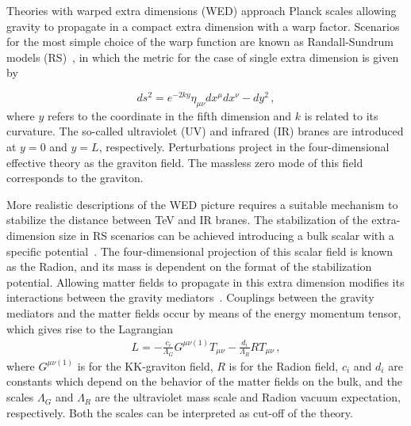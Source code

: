 Theories with warped extra dimensions (WED) approach Planck scales allowing gravity 
to propagate in a compact extra dimension with a warp factor.
Scenarios for the most simple choice of the warp function are known as Randall-Sundrum models
(RS)~\cite{Randall:1999ee}, in which the metric for the case of single extra dimension is given by

\begin{equation}
ds^2 =  e^{- 2 k y}  \eta_{\mu\nu} dx^\mu dx^\nu - dy^2 \,,
\label{expky}
\end{equation}
where $y$ refers to the coordinate in the fifth dimension and $k$ is related to its curvature.
The so-called ultraviolet (UV) and infrared (IR) branes are introduced at $y=0$ and $y=L$,
respectively.
Perturbations project in the four-dimensional effective theory
as the graviton field. The massless zero mode of this field corresponds to the graviton.

More realistic descriptions of the WED picture requires a suitable mechanism to stabilize the
distance between TeV and IR branes.
The stabilization of the extra-dimension size in RS scenarios can be achieved introducing a bulk scalar
with a specific potential~\cite{Goldberger:1999uk}.
The four-dimensional projection of this scalar field is known as the Radion, 
and its mass is dependent on the format of the stabilization potential. %
Allowing matter fields to propagate in this extra dimension modifies its interactions between the gravity mediators~\cite{Gherghetta:2010cj}. 
Couplings between the gravity mediators and the matter fields occur by means of the
energy momentum tensor, which gives rise to the Lagrangian~\cite{Giudice:1998ck,Csaki:2000zn}
\begin{eqnarray}
L = - \frac{c_i}{\Lambda_G}  G^{\mu\nu(1)} T_{\mu\nu}
- \frac{d_i}{\Lambda_{R}}  R T_{\mu\nu} \,,
\label{eq:wed_lagrangian}
\end{eqnarray}
where $G^{\mu\nu(1)}$ is for the KK-graviton field, $R$ is for the Radion field,
$c_i$ and $d_i$ are constants which depend on the behavior of the matter fields on the bulk, and
the scales $\Lambda_G$ and $\Lambda_R$ are the ultraviolet mass scale and Radion vacuum expectation,
respectively. Both the scales can be interpreted as cut-off of the theory.

